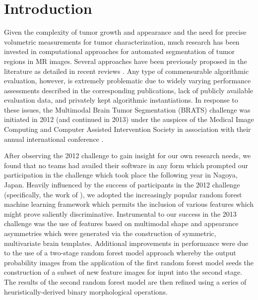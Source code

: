 \documentclass[final,5p,times,twocolumn]{elsarticle}
\begin{document}




%
%
%

\section{Introduction}
Given the complexity of tumor growth and appearance and the need
for precise volumetric measurements for tumor characterization, 
much research has been invested in computational approaches for 
automated segmentation of tumor regions in MR images.  Several 
approaches have been previously proposed in the literature as
detailed in recent reviews \citep{angelini2007,bauer2013}.  
Any type of commensurable algorithmic evaluation, however, is
extremely problematic due to widely varying performance assessments
described in the corresponding publications, lack of publicly available 
evaluation data, and privately kept algorithmic instantiations.  
In response to these issues, the Multimodal Brain Tumor Segmentation 
(BRATS) challenge was initiated in 2012 (and continued in 2013) under 
the auspices of the Medical Image Computing and Computer Assisted 
Intervention Society in association with their annual international 
conference \citep{menze2014}.


After observing the 2012 challenge to gain insight for our own research 
needs, we found that no teams had availed their software in any 
form which prompted our participation in the challenge which took place
the following year in Nagoya, Japan.  Heavily influenced by the success 
of participants in the 2012 challenge (specifically, the work of 
\cite{bauer2012,geremia2012,zikic2012}), we adopted the increasingly popular 
random forest machine learning framework \citep{breiman2001} which 
permits the inclusion of various features which might prove saliently 
discriminative.  Instrumental to our success in the 2013 challenge 
was the use of features based on multimodal shape and appearance 
asymmetries which were generated via the construction of symmetric, 
multivariate brain templates.  Additional improvements in performance
were due to the use of a two-stage random forest model approach
whereby the output probability images from the application of the first
random forest model seeds the construction of a subset of new feature images
for input into the second stage.  The results of the second random forest model
are then refined using a series of heuristically-derived binary morphological
operations.
\end{document}
